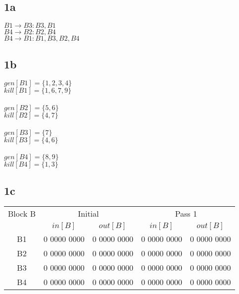 \documentclass[10pt,a4paper]{article}
\author{Lucas Swartsenburg\\6174388}
\begin{document}
\subsection*{1a}
$B1 \rightarrow B3:{B3,B1}$ \\
$B4 \rightarrow B2:{B2,B4}$ \\
$B4 \rightarrow B1:{B1,B3,B2,B4}$

\subsection*{1b}
$gen[B1]= \{1,2,3,4\} $\\
$kill[B1]= \{1,6,7,9\} $\\
\\
$gen[B2]= \{5,6\} $\\
$kill[B2]= \{4,7\} $\\
\\
$gen[B3]= \{7\} $\\
$kill[B3]= \{4,6\} $\\
\\
$gen[B4]= \{8,9\} $\\
$kill[B4]= \{1,3\} $\\

\subsection*{1c}
\begin{tabular}{|c|c|c|c|c|}
\hline 
Block B	& \multicolumn{2}{|c|}{Initial} & \multicolumn{2}{|c|}{Pass 1}  \\  \cline{2-5}
		& $in[B]$ 		& $out[B]$ 		& $in[B]$ 		& $out[B]$      \\ 
\hline 	
B1 		& 0 0000 0000 	& 0 0000 0000 	& 0 0000 0000 	&  0 0000 0000 	\\ 
B2 		& 0 0000 0000 	& 0 0000 0000 	& 0 0000 0000 	&  0 0000 0000 	\\ 
B3 		& 0 0000 0000 	& 0 0000 0000 	& 0 0000 0000 	&  0 0000 0000 	\\ 
B4 		& 0 0000 0000 	& 0 0000 0000 	& 0 0000 0000 	&  0 0000 0000 	\\ 
\hline 
\end{tabular} 
\end{document}

